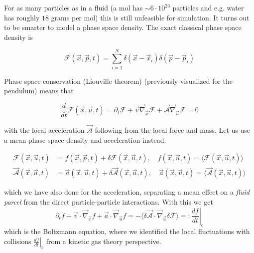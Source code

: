 For as many particles as in a fluid (a mol has $\sim 6\cdot10^{23}$ particles and e.g. water has roughly $18$ grams per mol) this is still unfeasible for simulation.
It turns out to be smarter to model a phase space density. The exact classical phase space density is

\begin{equation}
    \mathcal{F}(\vec{x},\vec{p},t) = \sum_{i=1}^{N} \delta (\vec{x} - \vec{x}_i) \delta (\vec{p} - \vec{p}_i)
\end{equation}

Phase space conservation (Liouville theorem) (previously visualized for the pendulum) means that

\begin{equation}
    \frac{d}{dt} \mathcal{F}(\vec{x},\vec{u},t) = \partial_t \mathcal{F} + \vec{v} \vec{\nabla}_\vec{x} \mathcal{F} + \vec{\mathcal{A}} \vec{\nabla}_\vec{u} \mathcal{F} = 0
\end{equation}

with the local acceleration $\vec{\mathcal{A}}$ following from the local force and mass. Let us use a mean phase space density and acceleration instead.

\begin{equation}
    \begin{aligned}
        \mathcal{F}(\vec{x},\vec{u},t) &= f(\vec{x},\vec{p},t) + \delta \mathcal{F}(\vec{x},\vec{u},t), \quad f(\vec{x},\vec{u},t) = \langle \mathcal{F}(\vec{x},\vec{u},t) \rangle \\
        \vec{\mathcal{A}}(\vec{x},\vec{u},t) &= \vec{a}(\vec{x},\vec{u},t) + \delta \vec{\mathcal{A}}(\vec{x},\vec{u},t), \quad \vec{a}(\vec{x},\vec{u},t) = \langle \vec{\mathcal{A}}(\vec{x},\vec{u},t) \rangle
    \end{aligned}
\end{equation}

which we have also done for the acceleration, separating a mean effect on a \textit{fluid parcel} from the direct particle-particle interactions. With this we
get
\begin{equation}
    \partial_t f + \vec{v}\cdot \vec{\nabla}_{\vec{x}}f + \vec{a} \cdot \vec{\nabla}_{\vec{u}}f = -\langle \delta \vec{\mathcal{A}} \cdot \vec{\nabla}_{\vec{u}} \delta \mathcal{F} \rangle =: \left. \frac{df}{dt} \right|_c
\end{equation}
which is the Boltzmann equation, where we identified the local fluctuations with collisions $\left. \frac{df}{dt} \right|_c$ from a kinetic gas theory perspective.

